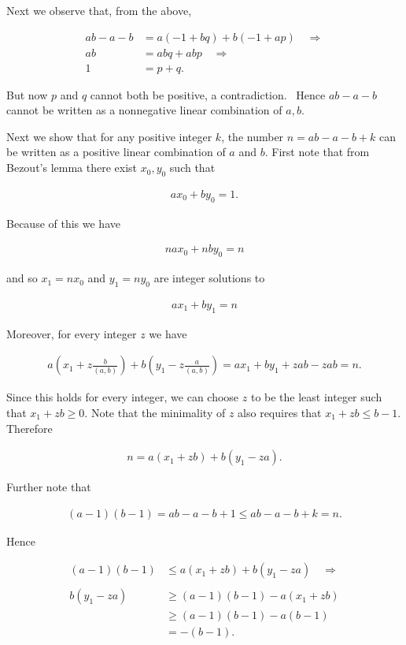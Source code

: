 \documentclass[11pt]{article}
\begin{document}
Next we observe that, from the above,

\begin{align*}
    ab-a-b &= a(-1+bq)+b(-1+ap) \quad \Rightarrow \\
    ab &= abq + abp \quad \Rightarrow \\
    1 &= p+q.
\end{align*}

But now $p$ and $q$ cannot both be positive, a contradiction.  \lightning \ Hence $ab-a-b$ cannot be written as a nonnegative linear combination of $a,b$.  

Next we show that for any positive integer $k$, the number $n=ab-a-b+k$ can be written as a positive linear combination of $a$ and $b$.  First note that from Bezout's lemma there exist $x_0,y_0$ such that 

\begin{align*}
    ax_0+by_0=1.
\end{align*}

Because of this we have

\begin{align*}
    nax_0 + nby_0=n
\end{align*}

and so $x_1=nx_0$ and $y_1=ny_0$ are integer solutions to 

\begin{align*}
    ax_1+by_1= n
\end{align*}

Moreover, for every integer $z$ we have

\begin{align*}
    a\left(x_1 + z\frac{b}{(a,b)}\right)+b\left(y_1 - z\frac{a}{(a,b)}\right) = ax_1+by_1+zab-zab = n. 
\end{align*}

Since this holds for every integer, we can choose $z$ to be the least integer such that $x_1+zb\geq 0$.  Note that the minimality of $z$ also requires that $x_1 + zb \leq b-1$.  Therefore 

\begin{align*}
    n = a(x_1+zb)+b(y_1-za).
\end{align*}

Further note that 

\begin{align*}
    (a-1)(b-1) = ab-a-b+1 \le ab-a-b+k=n.
\end{align*}

Hence 

\begin{align*}
    (a-1)(b-1) &\le a(x_1+zb)+b(y_1-za) \quad \Rightarrow \\\\
    b(y_1-za) &\ge (a-1)(b-1)-a(x_1+zb) \\
    &\ge (a-1)(b-1)-a(b-1) \\
    &= -(b-1).
\end{align*}
\end{document}

